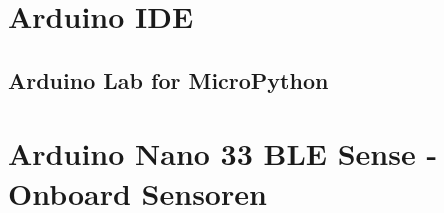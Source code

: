 \documentclass[10pt,a4paper,bibliography=totoc]{scrbook}
\begin{document}


\tableofcontents
\cleardoublepage

\listoffigures
\cleardoublepage

\listofcodes
\cleardoublepage

\cleardoublepage


{



{
\part{Arduino IDE}

    
      
    
   

      
    
  \chapter{Arduino Lab for MicroPython}
}





{


\part{Arduino Nano 33 BLE Sense - Onboard Sensoren}




















}}
\end{document}
